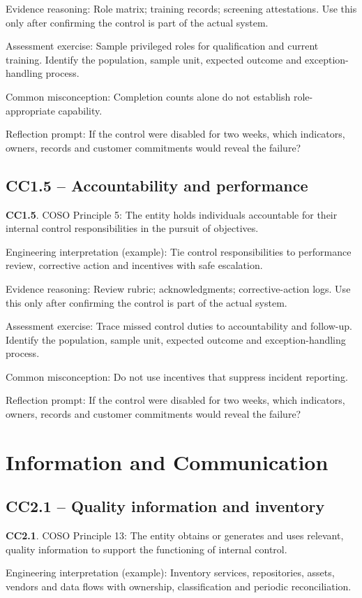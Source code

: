 \documentclass[10pt,oneside]{report}
\begin{document}
Evidence reasoning: Role matrix; training records; screening attestations. Use this only after confirming the control is part of the actual system.

Assessment exercise: Sample privileged roles for qualification and current training. Identify the population, sample unit, expected outcome and exception-handling process.

Common misconception: Completion counts alone do not establish role-appropriate capability.

Reflection prompt: If the control were disabled for two weeks, which indicators, owners, records and customer commitments would reveal the failure?

\subsection{CC1.5 -- Accountability and performance}
\begin{aicpabox}
\textbf{CC1.5}. COSO Principle 5: The entity holds individuals accountable for their internal control responsibilities in the pursuit of objectives.\par{}
\end{aicpabox}
Engineering interpretation (example): Tie control responsibilities to performance review, corrective action and incentives with safe escalation.

Evidence reasoning: Review rubric; acknowledgments; corrective-action logs. Use this only after confirming the control is part of the actual system.

Assessment exercise: Trace missed control duties to accountability and follow-up. Identify the population, sample unit, expected outcome and exception-handling process.

Common misconception: Do not use incentives that suppress incident reporting.

Reflection prompt: If the control were disabled for two weeks, which indicators, owners, records and customer commitments would reveal the failure?

\section{Information and Communication}
\subsection{CC2.1 -- Quality information and inventory}
\begin{aicpabox}
\textbf{CC2.1}. COSO Principle 13: The entity obtains or generates and uses relevant, quality information to support the functioning of internal control.\par{}
\end{aicpabox}
Engineering interpretation (example): Inventory services, repositories, assets, vendors and data flows with ownership, classification and periodic reconciliation.
\end{document}
